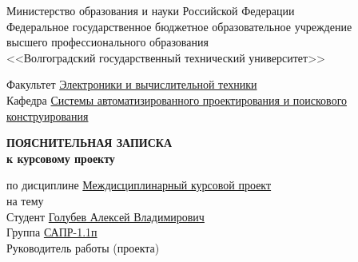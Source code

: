 \begin{titlepage}
    \begin{center}
        Министерство образования и науки Российской Федерации \\
        Федеральное государственное бюджетное образовательное учреждение\\
        высшего профессионального образования\\
        <<Волгоградский государственный технический университет>>\\
    \end{center}
    Факультет \underline{\hspace{1cm}Электроники и вычислительной техники\hspace{4.75cm}}\\
    Кафедра \underline{\hspace{1.4cm}Системы автоматизированного проектирования и поискового\hspace{0.3cm}}\\
    \underline{конструирования\hspace{13.3cm}}
    \vspace{1cm}
    \begin{center}
        \large \MakeUppercase{\textbf{пояснительная записка}} \\
        \normalsize\vspace{-0.2cm}\textbf{к курсовому проекту}
    \end{center}
    \begin{flushleft}
        по дисциплине \underline{\hspace{1cm}Междисциплинарный курсовой проект\hspace{4.1cm}}\\
        на тему \underline{\hspace{15.2cm}}\\
        \underline{\hspace{\textwidth}}
        Студент \underline{\hspace{1cm}Голубев Алексей Владимирович\hspace{2cm}} \\
        Группа \underline{\hspace{1cm}САПР-1.1п\hspace{2cm}}\\
        Руководитель работы (проекта) \underline{\hspace{5cm}}
            \hspace{0.5cm} \underline{\hspace{4.2cm}}\\

\end{flushleft}
\end{titlepage}
